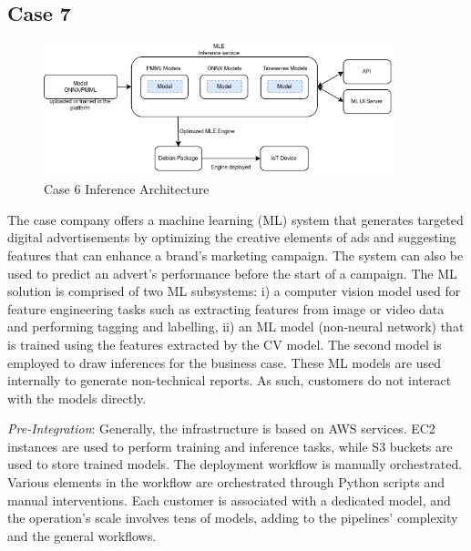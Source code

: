 \subsection*{Case 7} %
\label{case: 7}


\begin{figure}[t]
\centering
\includegraphics[width=0.9\textwidth]{images/case6_deployment_process_v2.png}
\caption{Case 6 Inference Architecture}
\label{fig: case6_deployment_process}
\end{figure}

The case company offers a machine learning (ML) system that generates targeted digital advertisements by optimizing the creative elements of ads and suggesting features that can enhance a brand's marketing campaign. The system can also be used to predict an advert's performance before the start of a campaign. The ML solution is comprised of two ML subsystems: i) a computer vision model used for feature engineering tasks such as extracting features from image or video data and performing tagging and labelling, ii) an ML model (non-neural network) that is trained using the features extracted by the CV model. The second model is employed to draw inferences for the business case. These ML models are used internally to generate non-technical reports. As such, customers do not interact with the models directly. %

\textit{Pre-Integration}: Generally, the infrastructure is based on AWS services. EC2 instances are used to perform training and inference tasks, while S3 buckets are used to store trained models. The deployment workflow is manually orchestrated. Various elements in the workflow are orchestrated through Python scripts and manual interventions. Each customer is associated with a dedicated model, and the operation's scale involves tens of models, adding to the pipelines' complexity and the general workflows.

